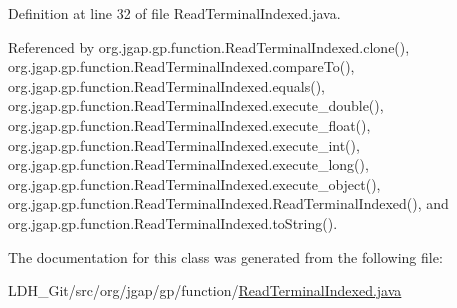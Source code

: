 Definition at line 32 of file Read\-Terminal\-Indexed.\-java.



Referenced by org.\-jgap.\-gp.\-function.\-Read\-Terminal\-Indexed.\-clone(), org.\-jgap.\-gp.\-function.\-Read\-Terminal\-Indexed.\-compare\-To(), org.\-jgap.\-gp.\-function.\-Read\-Terminal\-Indexed.\-equals(), org.\-jgap.\-gp.\-function.\-Read\-Terminal\-Indexed.\-execute\-\_\-double(), org.\-jgap.\-gp.\-function.\-Read\-Terminal\-Indexed.\-execute\-\_\-float(), org.\-jgap.\-gp.\-function.\-Read\-Terminal\-Indexed.\-execute\-\_\-int(), org.\-jgap.\-gp.\-function.\-Read\-Terminal\-Indexed.\-execute\-\_\-long(), org.\-jgap.\-gp.\-function.\-Read\-Terminal\-Indexed.\-execute\-\_\-object(), org.\-jgap.\-gp.\-function.\-Read\-Terminal\-Indexed.\-Read\-Terminal\-Indexed(), and org.\-jgap.\-gp.\-function.\-Read\-Terminal\-Indexed.\-to\-String().



The documentation for this class was generated from the following file\-:\begin{DoxyCompactItemize}
\item 
L\-D\-H\-\_\-\-Git/src/org/jgap/gp/function/\hyperlink{_read_terminal_indexed_8java}{Read\-Terminal\-Indexed.\-java}\end{DoxyCompactItemize}

